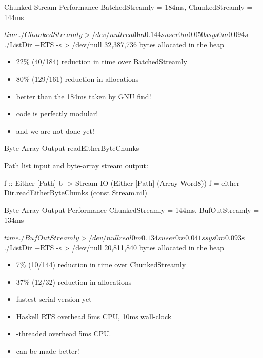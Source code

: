 \documentclass[17pt]{beamer}
\begin{document}
\begin{frame}[fragile]{Chunked Stream Performance}
{BatchedStreamly = 184ms, ChunkedStreamly = 144ms}

\begin{code}
$ time ./ChunkedStreamly > /dev/null
real    0m0.144s
user    0m0.050s
sys     0m0.094s

$ ./ListDir +RTS -s > /dev/null
      32,387,736 bytes allocated in the heap
\end{code}

\scriptsize
\begin{itemize}
\item 22\% (40/184) reduction in time over BatchedStreamly
\item 80\% (129/161) reduction in allocations
\item better than the 184ms taken by GNU find!
\item code is perfectly modular!
\item and we are not done yet!
\end{itemize}
\end{frame}

\begin{frame}[fragile]{Byte Array Output}
{readEitherByteChunks}

Path list input and byte-array stream output:
\begin{code}
f :: Either [Path] b
  -> Stream IO (Either [Path] (Array Word8))
f = either
      Dir.readEitherByteChunks
      (const Stream.nil)
\end{code}
\end{frame}

\begin{frame}[fragile]{Byte Array Output Performance}
{ChunkedStreamly = 144ms, BufOutStreamly = 134ms}

\begin{code}
$ time ./BufOutStreamly > /dev/null
real    0m0.134s
user    0m0.041s
sys     0m0.093s

$ ./ListDir +RTS -s > /dev/null
      20,811,840 bytes allocated in the heap
\end{code}

\scriptsize
\begin{itemize}
\item 7\% (10/144) reduction in time over ChunkedStreamly
\item 37\% (12/32) reduction in allocations
\item fastest serial version yet
\item Haskell RTS overhead 5ms CPU, 10ms wall-clock
\item -threaded overhead 5ms CPU.
\item can be made better!
\end{itemize}
\end{frame}
\end{document}
